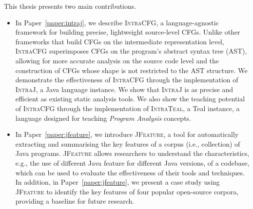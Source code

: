 This thesis presents two main contributions.
\begin{itemize}
	\item In Paper~\ref{paper:intraj},  we describe \textsc{IntraCFG}, a language-agnostic framework for building
	precise, lightweight source-level CFGs. Unlike other frameworks that
	build CFGs on the intermediate representation level, \textsc{IntraCFG} superimposes
	CFGs on the program's abstract syntax tree (AST), allowing for more accurate
	analysis on the source code level and the construction of CFGs whose shape is not
	restricted to the AST structure. We demonstrate the effectiveness
	of \textsc{IntraCFG} through the implementation of \textsc{IntraJ}, a Java language
	instance. We show that \textsc{IntraJ} is as precise and efficient as existing
	static analysis tools. We also show the teaching potential of \textsc{IntraCFG}
	through the implementation of \textsc{IntraTeal}, a Teal instance,
	 a language designed for teaching \emph{Program Analysis} concepts.
	\item In Paper~\ref{paper:jfeature}, we introduce \textsc{JFeature}, a tool for automatically extracting and summarising
	the key features of a corpus (i.e., collection) of Java programs. \textsc{JFeature}
	allows researchers to understand the characteristics, e.g.,
	the use of different Java feature for different Java versions, of a codebase,
	which can be used to evaluate the effectiveness of their tools and techniques.
	In addition, in Paper~\ref{paper:jfeature}, we present a case study using \textsc{JFeature} to
	identify the key features of four popular open-source corpora, providing a
	baseline for future research.
\end{itemize}


